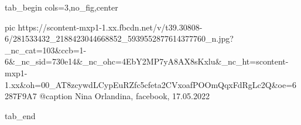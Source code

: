  
 
 
 
 

\ifcmt
  tab_begin cols=3,no_fig,center

     pic https://scontent-mxp1-1.xx.fbcdn.net/v/t39.30808-6/281533432_2188423044668852_5939552877614377760_n.jpg?_nc_cat=103&ccb=1-6&_nc_sid=730e14&_nc_ohc=4EbY2MP7yA8AX8sKxlu&_nc_ht=scontent-mxp1-1.xx&oh=00_AT8zcywdLCypEuRZfc5cfeta2CVxoafPOOmQqxFdRgLc2Q&oe=6287F9A7
		 @caption Nina Orlandina, facebook, 17.05.2022

  tab_end
\fi
